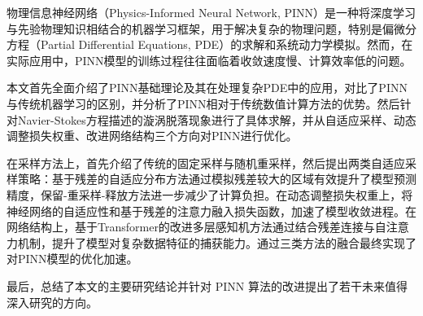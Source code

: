 \begin{abstractzh}

物理信息神经网络（Physics-Informed Neural Network, PINN）是一种将深度学习与先验物理知识相结合的机器学习框架，用于解决复杂的物理问题，特别是偏微分方程（Partial Differential Equations, PDE）的求解和系统动力学模拟。然而，在实际应用中，PINN模型的训练过程往往面临着收敛速度慢、计算效率低的问题。

本文首先全面介绍了PINN基础理论及其在处理复杂PDE中的应用，对比了PINN与传统机器学习的区别，并分析了PINN相对于传统数值计算方法的优势。然后针对Navier-Stokes方程描述的漩涡脱落现象进行了具体求解，并从自适应采样、动态调整损失权重、改进网络结构三个方向对PINN进行优化。

在采样方法上，首先介绍了传统的固定采样与随机重采样，然后提出两类自适应采样策略：基于残差的自适应分布方法通过模拟残差较大的区域有效提升了模型预测精度，保留-重采样-释放方法进一步减少了计算负担。在动态调整损失权重上，将神经网络的自适应性和基于残差的注意力融入损失函数，加速了模型收敛进程。在网络结构上，基于Transformer的改进多层感知机方法通过结合残差连接与自注意力机制，提升了模型对复杂数据特征的捕获能力。通过三类方法的融合最终实现了对PINN模型的优化加速。

最后，总结了本文的主要研究结论并针对 PINN 算法的改进提出了若干未来值得深入研究的方向。

\end{abstractzh}